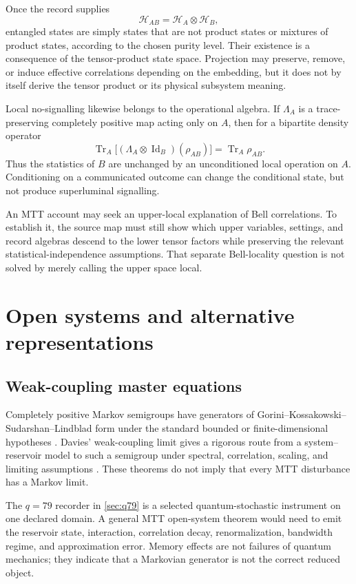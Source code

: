 \documentclass[11pt]{article}
\theoremstyle{definition}
\theoremstyle{remark}
\newcommand{\cH}{\mathcal H}
\newcommand{\Id}{\operatorname{Id}}
\newcommand{\Tr}{\operatorname{Tr}}
\begin{document}
Once the record supplies
\[
\cH_{AB}=\cH_A\otimes\cH_B,
\]
entangled states are simply states that are not product states or mixtures
of product states, according to the chosen purity level.  Their existence is
a consequence of the tensor-product state space.  Projection may preserve,
remove, or induce effective correlations depending on the embedding, but it
does not by itself derive the tensor product or its physical subsystem
meaning.

Local no-signalling likewise belongs to the operational algebra.  If
\(\Lambda_A\) is a trace-preserving completely positive map acting only on
\(A\), then for a bipartite density operator
\[
\Tr_A\bigl[(\Lambda_A\otimes\Id_B)(\rho_{AB})\bigr]
=\Tr_A\rho_{AB}.
\]
Thus the statistics of \(B\) are unchanged by an unconditioned local
operation on \(A\).  Conditioning on a communicated outcome can change the
conditional state, but not produce superluminal signalling.

An MTT account may seek an upper-local explanation of Bell correlations.
To establish it, the source map must still show which upper variables,
settings, and record algebras descend to the lower tensor factors while
preserving the relevant statistical-independence assumptions.  That
separate Bell-locality question is not solved by merely calling the upper
space local.

\section{Open systems and alternative representations}
\label{sec:extensions}

\subsection{Weak-coupling master equations}

Completely positive Markov semigroups have generators of
Gorini--Kossakowski--Sudarshan--Lindblad form under the standard bounded or
finite-dimensional hypotheses
\cite{GoriniKossakowskiSudarshan1976,Lindblad1976}.  Davies' weak-coupling
limit gives a rigorous route from a system--reservoir model to such a
semigroup under spectral, correlation, scaling, and limiting assumptions
\cite{Davies1974}.  These theorems do not imply that every MTT disturbance
has a Markov limit.

The \(q=79\) recorder in \cref{sec:q79} is a selected quantum-stochastic
instrument on one declared domain.  A general MTT open-system theorem would
need to emit the reservoir state, interaction, correlation decay,
renormalization, bandwidth regime, and approximation error.  Memory effects
are not failures of quantum mechanics; they indicate that a Markovian
generator is not the correct reduced object.
\end{document}
